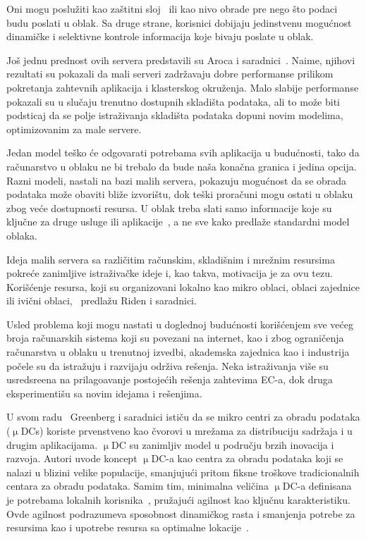 Oni mogu poslu\v ziti kao za\v stitni sloj~\cite{SatyanarayananK19} ili kao nivo obrade pre nego \v sto podaci budu poslati u oblak. Sa druge strane, korisnici dobijaju jedinstvenu mogu\'cnost dinami\v cke i selektivne kontrole informacija koje bivaju poslate u oblak. 

Jo\v s jednu prednost ovih servera predstavili su Aroca i saradnici~\cite{ArocaG12}. Naime, njihovi rezultati su pokazali da mali serveri zadr\v zavaju dobre performanse prilikom pokretanja zahtevnih aplikacija i klasterskog okru\v zenja. Malo slabije performanse pokazali su u slu\v caju trenutno dostupnih skladi\v sta podataka, ali to mo\v ze biti podsticaj da se polje istra\v zivanja skladi\v sta podataka dopuni novim modelima, optimizovanim za male servere.

Jedan model te\v sko \'ce odgovarati potrebama svih aplikacija u budu\'cnosti, tako da ra\v cunarstvo u oblaku ne bi trebalo da bude na\v sa kona\v cna granica i jedina opcija. Razni modeli, nastali na bazi malih servera, pokazuju mogu\'cnost da se obrada podataka mo\v ze obaviti bli\v ze izvori\v stu, dok te\v ski prora\v cuni mogu ostati u oblaku zbog ve\'ce dostupnosti resursa. U oblak treba slati samo informacije koje su klju\v cne za druge usluge ili aplikacije~\cite{inproceedingsSimic1}, a ne sve kako predla\v ze standardni model oblaka. 

Ideja malih servera sa razli\v citim ra\v cunskim, skladi\v snim i mre\v znim resursima pokre\'ce zanimljive istra\v ziva\v cke ideje i, kao takva, motivacija je za ovu tezu. Kori\v s\'cenje resursa, koji su organizovani lokalno kao mikro oblaci, oblaci zajednice ili ivi\v cni oblaci,~\cite{RydenOCW14} predla\v zu Riden i saradnici.

Usled problema koji mogu nastati u doglednoj budu\'cnosti kori\v s\'cenjem sve ve\'ceg broja ra\v cunarskih sistema koji su povezani na internet, kao i  zbog ograni\v cenja ra\v cunarstva u oblaku u trenutnoj izvedbi, akademska zajednica kao i industrija po\v cele su da istra\v zuju i razvijaju odr\v ziva re\v senja. Neka istra\v zivanja vi\v se su usredsre\dj ena na prilago\dj avanje postoje\'cih re\v senja zahtevima EC-a, dok druga eksperimenti\v su sa novim idejama i re\v senjima.

U svom radu~\cite{GreenbergHMP09} Greenberg i saradnici isti\v cu da se mikro centri za obradu podataka ($\upmu$DCs) koriste prvenstveno kao \v cvorovi u mre\v zama za distribuciju sadr\v zaja i u drugim  aplikacijama. $\upmu$DC su zanimljiv model u podru\v cju brzih inovacija i razvoja. Autori uvode koncept $\upmu$DC-a kao centra za obradu podataka koji se nalazi u blizini velike populacije, smanjuju\'ci pritom fiksne tro\v skove tradicionalnih centara za obradu podataka. Samim tim, minimalna veli\v cina $\upmu$DC-a definisana je potrebama lokalnih korisnika~\cite{GreenbergHMP09, AbbasZTS18}, pru\v zaju\'ci agilnost kao klju\v cnu karakteristiku. Ovde agilnost podrazumeva sposobnost dinami\v ckog rasta i smanjenja potrebe za resursima kao i upotrebe resursa sa optimalne lokacije~\cite{GreenbergHMP09}. 

